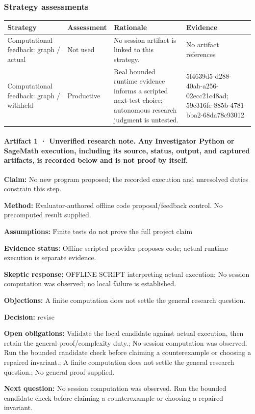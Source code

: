 \documentclass[11pt]{article}
\begin{document}
\subsubsection*{Strategy assessments}
\begin{longtable}{>{\raggedright\arraybackslash}p{.16\linewidth}>{\raggedright\arraybackslash}p{.15\linewidth}>{\raggedright\arraybackslash}p{.40\linewidth}>{\raggedright\arraybackslash}p{.17\linewidth}}
\toprule Strategy & Assessment & Rationale & Evidence \\
\midrule\endhead
Computational feedback: graph / actual & Not used & No session artifact is linked to this strategy. & No artifact references \\
Computational feedback: graph / withheld & Productive & Real bounded runtime evidence informs a scripted next-test choice; autonomous research judgment is untested. & 5f4639d5-d288-40ab-a256-02ecc21c48ad; 59c316fe-885b-4781-bba2-68da78c93012 \\
\bottomrule
\end{longtable}
\paragraph{Artifact 1 · Unverified research note. Any Investigator Python or SageMath execution, including its source, status, output, and captured artifacts, is recorded below and is not proof by itself.}
\textbf{Claim:} No new program proposed; the recorded execution and unresolved duties constrain this step.\par
\textbf{Method:} Evaluator-authored offline code proposal/feedback control. No precomputed result supplied.\par
\textbf{Assumptions:} Finite tests do not prove the full project claim\par
\textbf{Evidence status:} Offline scripted provider proposes code; actual runtime execution is separate evidence.\par
\textbf{Skeptic response:} OFFLINE SCRIPT interpreting actual execution: No session computation was observed; no local failure is established.\par
\textbf{Objections:} A finite computation does not settle the general research question.\par
\textbf{Decision:} revise\par
\textbf{Open obligations:} Validate the local candidate against actual execution, then retain the general proof/complexity duty.; No session computation was observed. Run the bounded candidate check before claiming a counterexample or choosing a repaired invariant.; A finite computation does not settle the general research question.; No general proof supplied.\par
\textbf{Next question:} No session computation was observed. Run the bounded candidate check before claiming a counterexample or choosing a repaired invariant.\par
\end{document}
